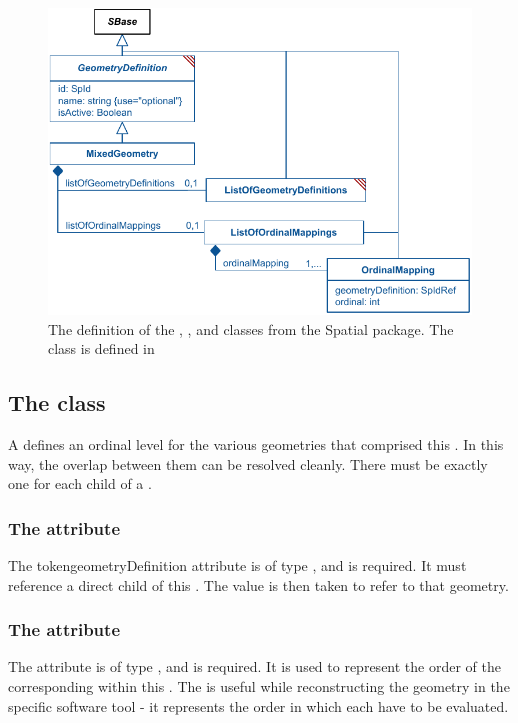 \begin{figure}[ht]
  \includegraphics{figs/MixedGeometry-uml}
  \caption{The definition of the \MixedGeometry, \ListOfOrdinalMappings, and \OrdinalMapping classes from the Spatial package.  The \ListOfGeometryDefinitions class is defined in }
  \label{mixedgeometry-uml}
\end{figure}

\subsection{The  class}
\label{ordinalmapping-class}
A \OrdinalMapping defines an ordinal level for the various geometries that comprised this \MixedGeometry.  In this way, the overlap between them can be resolved cleanly.  There must be exactly one \OrdinalMapping for each child \GeometryDefinition of a \MixedGeometry.



\subsubsection{The \fixttspace{} attribute}
The token{geometryDefinition} attribute is of type , and is required.  It must reference a direct child \GeometryDefinition of this \MixedGeometry.  The  value is then taken to refer to that geometry.


\subsubsection{The \fixttspace{} attribute}
The  attribute is of type , and is required. It is used to represent the order of the corresponding \GeometryDefinition within this \MixedGeometry.  The  is useful while reconstructing the geometry in the specific software tool - it represents the order in which each \GeometryDefinition have to be evaluated.

